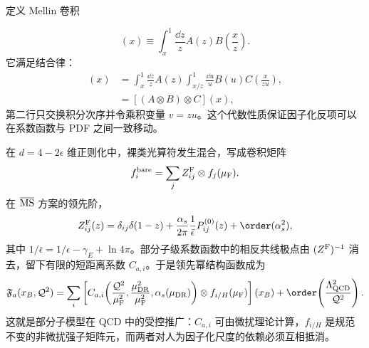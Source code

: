 \begin{derivation}[从矩展开到共线卷积]
定义 Mellin 卷积

\begin{equation*}
 [A\otimes B](x)
 \equiv\int_x^1\frac{\dd z}{z}
 A(z)B\!\left(\frac{x}{z}\right).
\end{equation*}
它满足结合律：
\begin{align*}
 [A\otimes(B\otimes C)](x)
 &=\int_x^1\frac{\dd z}{z}A(z)
 \int_{x/z}^1\frac{\dd u}{u}B(u)
 C\!\left(\frac{x}{zu}\right),\\
 &=[(A\otimes B)\otimes C](x),
\end{align*}
第二行只交换积分次序并令乘积变量 $v=zu$。这个代数性质保证因子化反项可以在系数函数与 PDF 之间一致移动。

在 $d=4-2\epsilon$ 维正则化中，裸类光算符发生混合，写成卷积矩阵
\begin{equation*}
 f_i^{\rm bare}
 =\sum_j Z_{ij}^{\rm F}\otimes f_j(\mu_{\rm F}).
\end{equation*}
在 $\overline{\rm MS}$ 方案的领先阶，
\begin{equation*}
 Z_{ij}^{\rm F}(z)
 =\delta_{ij}\delta(1-z)
 +\frac{\alpha_s}{2\pi}
 \frac1{\bar\epsilon}
 P_{ij}^{(0)}(z)
 +\order(\alpha_s^2),
\end{equation*}
其中 $1/\bar\epsilon=1/\epsilon-\gamma_E+\ln4\pi$。部分子级系数函数中的相反共线极点由 $(Z^{\rm F})^{-1}$ 消去，留下有限的短距离系数 $C_{a,i}$。于是领先幂结构函数成为
\begin{equation*}
 \mathfrak F_a(x_B,\mathcal Q^2)
 =\sum_i
 \left[
 C_{a,i}\!\left(
 \frac{\mathcal Q^2}{\mu_{\rm F}^2},
 \frac{\mu_{\rm DR}^2}{\mu_{\rm F}^2},
 \alpha_s(\mu_{\rm DR})
 \right)
 \otimes f_{i/H}(\mu_{\rm F})
 \right](x_B)
 +\order\!\left(\frac{\Lambda_{\rm QCD}^2}{\mathcal Q^2}\right).
\end{equation*}
这就是部分子模型在 QCD 中的受控推广：$C_{a,i}$ 可由微扰理论计算，$f_{i/H}$ 是规范不变的非微扰强子矩阵元，而两者对人为因子化尺度的依赖必须互相抵消。
\end{derivation}

